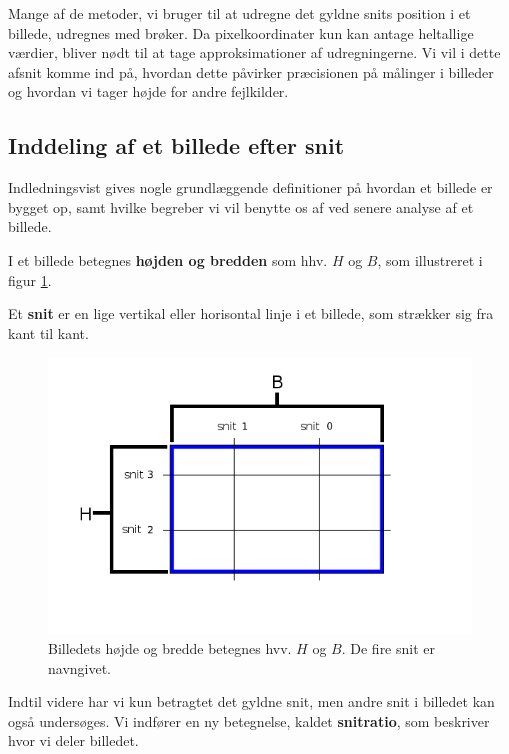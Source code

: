{
\textsf{
Mange af de metoder, vi bruger til at udregne det gyldne snits position
i et billede, udregnes med brøker. Da pixelkoordinater kun kan antage
heltallige værdier, bliver nødt til at tage approksimationer af
udregningerne. Vi vil i dette afsnit komme ind på, hvordan dette
påvirker præcisionen på målinger i billeder og hvordan vi tager højde
for andre fejlkilder.
}

\subsection{Inddeling af et billede efter snit}
Indledningsvist gives nogle grundlæggende definitioner på hvordan et
billede er bygget op, samt hvilke begreber vi vil benytte os af ved
senere analyse af et billede.

\begin{definition}
	I et billede betegnes \textbf{højden og bredden} som hhv. $H$ og
	$B$, som illustreret i figur \ref{cut}.
\end{definition}

\begin{definition}
    Et \textbf{snit} er en lige vertikal eller horisontal linje i et
    billede, som strækker sig fra kant til kant.
\end{definition}

\begin{figure}[!ht]
    \centering
    \includegraphics[scale=0.42,angle=0]{afsnit/vores_implementation/billeder/naiv_algoritme/Cut}
    \caption[]{Billedets højde og bredde betegnes hvv. $H$ og $B$. De
    fire snit er navngivet.}
    \label{cut}
\end{figure}

Indtil videre har vi kun betragtet det gyldne snit, men andre snit i
billedet kan også undersøges. Vi indfører en ny betegnelse, kaldet
\textbf{snitratio}, som beskriver hvor vi deler billedet.

}
